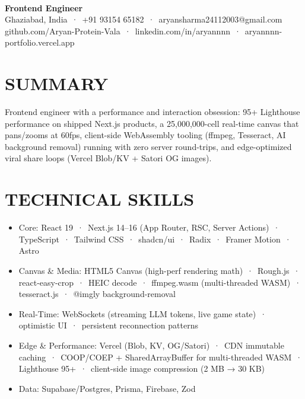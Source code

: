 \documentclass[9pt]{article}
\begin{document}
\\[3pt]
{\large\bfseries Frontend Engineer}\\[3pt]
{\small\color{greyc} Ghaziabad, India \,·\, +91 93154 65182 \,·\, aryansharma24112003@gmail.com}\vspace{-2pt}
{\small\color{greyc} github.com/Aryan-Protein-Vala \,·\, linkedin.com/in/aryannnn \,·\, aryannnn-portfolio.vercel.app}\vspace{-2pt}
\section*{SUMMARY}
Frontend engineer with a performance and interaction obsession: 95+ Lighthouse performance on shipped Next.js products, a 25,000,000-cell real-time canvas that pans/zooms at 60fps, client-side WebAssembly tooling (ffmpeg, Tesseract, AI background removal) running with zero server round-trips, and edge-optimized viral share loops (Vercel Blob/KV + Satori OG images).
\vspace{1pt}
\section*{TECHNICAL SKILLS}
\begin{itemize}[leftmargin=11pt,itemsep=0pt,topsep=1pt,parsep=0pt]
\item Core: React 19 \,·\, Next.js 14–16 (App Router, RSC, Server Actions) \,·\, TypeScript \,·\, Tailwind CSS \,·\, shadcn/ui \,·\, Radix \,·\, Framer Motion \,·\, Astro
\item Canvas \& Media: HTML5 Canvas (high-perf rendering math) \,·\, Rough.js \,·\, react-easy-crop \,·\, HEIC decode \,·\, ffmpeg.wasm (multi-threaded WASM) \,·\, tesseract.js \,·\, @imgly background-removal
\item Real-Time: WebSockets (streaming LLM tokens, live game state) \,·\, optimistic UI \,·\, persistent reconnection patterns
\item Edge \& Performance: Vercel (Blob, KV, OG/Satori) \,·\, CDN immutable caching \,·\, COOP/COEP + SharedArrayBuffer for multi-threaded WASM \,·\, Lighthouse 95+ \,·\, client-side image compression (2 MB → 30 KB)
\item Data: Supabase/Postgres, Prisma, Firebase, Zod
\end{itemize}
\end{document}
